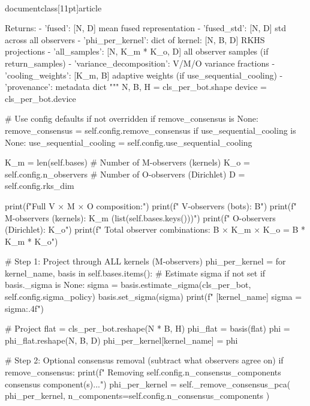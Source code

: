 \\documentclass[11pt]{article}
\begin{document}
\begin{CodeBlock}
{{{{        Returns:
            - 'fused': [N, D] mean fused representation
            - 'fused_std': [N, D] std across all observers
            - 'phi_per_kernel': dict of {kernel: [N, B, D]} RKHS projections
            - 'all_samples': [N, K_m * K_o, D] all observer samples (if return_samples)
            - 'variance_decomposition': V/M/O variance fractions
            - 'cooling_weights': [K_m, B] adaptive weights (if use_sequential_cooling)
            - 'provenance': metadata dict
        """
        N, B, H = cls_per_bot.shape
        device = cls_per_bot.device
        
        # Use config defaults if not overridden
        if remove_consensus is None:
            remove_consensus = self.config.remove_consensus
        if use_sequential_cooling is None:
            use_sequential_cooling = self.config.use_sequential_cooling
        
        K_m = len(self.bases)  # Number of M-observers (kernels)
        K_o = self.config.n_observers  # Number of O-observers (Dirichlet)
        D = self.config.rks_dim
        
        print(f"\n[VMO] Full V × M × O composition:")
        print(f"  V-observers (bots): {B}")
        print(f"  M-observers (kernels): {K_m} ({list(self.bases.keys())})")
        print(f"  O-observers (Dirichlet): {K_o}")
        print(f"  Total observer combinations: {B} × {K_m} × {K_o} = {B * K_m * K_o}")
        
        # Step 1: Project through ALL kernels (M-observers)
        phi_per_kernel = {}
        for kernel_name, basis in self.bases.items():
            # Estimate sigma if not set
            if basis._sigma is None:
                sigma = basis.estimate_sigma(cls_per_bot, self.config.sigma_policy)
                basis.set_sigma(sigma)
                print(f"  [{kernel_name}] sigma = {sigma:.4f}")
            
            # Project
            flat = cls_per_bot.reshape(N * B, H)
            phi_flat = basis(flat)
            phi = phi_flat.reshape(N, B, D)
            phi_per_kernel[kernel_name] = phi
        
        # Step 2: Optional consensus removal (subtract what observers agree on)
        if remove_consensus:
            print(f"  Removing {self.config.n_consensus_components} consensus component(s)...")
            phi_per_kernel = self._remove_consensus_pca(
                phi_per_kernel, 
                n_components=self.config.n_consensus_components
            )
        
}}}}
\end{CodeBlock}
\end{document}
